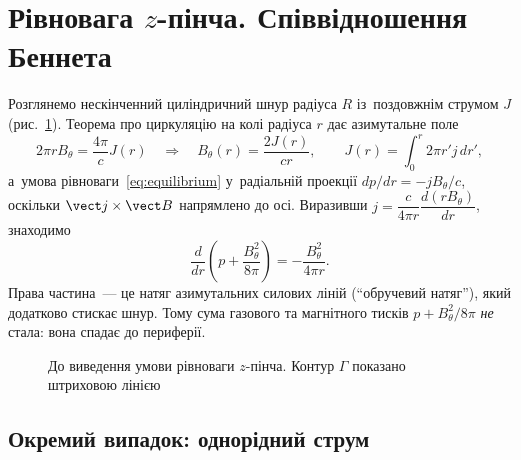 \section{Рівновага \texorpdfstring{$z$}{z}-пінча. Співвідношення Беннета}



Розглянемо нескінченний циліндричний шнур радіуса $R$ із~поздовжнім струмом $J$
(рис.~\ref{pic:z-pinch-equilibrium}). Теорема про циркуляцію на колі радіуса $r$ дає
азимутальне поле
\begin{equation*}
	2\pi rB_\theta=\frac{4\pi}cJ(r)\quad\Rightarrow\quad B_\theta(r)=\frac{2J(r)}{cr},\qquad J(r)=\int_0^r2\pi r'j\,dr',
\end{equation*}
а~умова рівноваги~\eqref{eq:equilibrium} у~радіальній проекції $dp/dr=-jB_\theta/c$,
оскільки $\vect j\times\vect B$ напрямлено до осі. Виразивши $j=\dfrac c{4\pi
r}\dfrac{d(rB_\theta)}{dr}$, знаходимо
\begin{equation}\label{eq:z-pinch-general}
	\frac{d}{dr}\left(p+\frac{B_\theta^2}{8\pi}\right)=-\frac{B_\theta^2}{4\pi r}.
\end{equation}
Права частина~--- це натяг азимутальних силових ліній (\enquote{обручевий натяг}), який
додатково стискає шнур. Тому сума газового та магнітного тисків $p+B_\theta^2/8\pi$
\emph{не} стала: вона спадає до периферії.

\begin{figure}[h!]\centering
	\caption{До виведення умови рівноваги $z$-пінча. Контур $\Gamma$ показано штриховою
	лінією}
	\label{pic:z-pinch-equilibrium}
\end{figure}



\subsection{Окремий випадок: однорідний струм}



